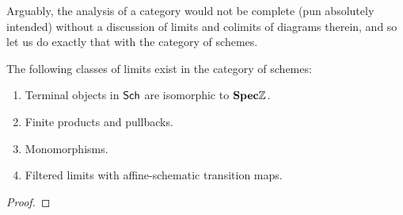                 Arguably, the analysis of a category would not be complete (pun absolutely intended) without a discussion of limits and colimits of diagrams therein, and so let us do exactly that with the category of schemes.
                \begin{proposition} \label{prop: limits_of_schemes} 
                    The following classes of limits exist in the category of schemes:
                        \begin{enumerate}
                            \item Terminal objects in $\mathsf{Sch}$ are isomorphic to $\mathbf{Spec} \mathbb{Z}$.
                            \item Finite products and pullbacks.
                            \item Monomorphisms.
                            \item Filtered limits with affine-schematic transition maps. 
                        \end{enumerate}
                \end{proposition}
                    \begin{proof}
                        
                    \end{proof}
                
